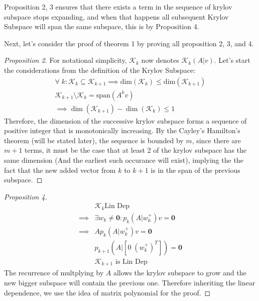 \documentclass[]{article}
\theoremstyle{definition}
\begin{document}
            Proposition 2, 3 ensures that there exists a term in the sequence of krylov subspace stops expanding, and when that happens all subsequent Krylov Subspace will span the same subspace, this is by Proposition 4. 
            \par
            Next, let's consider the proof of theorem 1 by proving all proposition 2, 3, and 4. 
            \begin{proof}[Proposition 2]
                For notational simplicity, $\mathcal K_k$ now denotes $\mathcal K_k(A|v)$. Let's start the considerations from the definition of the Krylov Subspace: 
                \begin{align}
                    \forall\; k: \mathcal K_k \subseteq \mathcal K_{k + 1}\implies \text{dim}(\mathcal K_{k})\le \text{dim}(\mathcal K_{k + 1})
                    \\
                    \mathcal K_{k + 1}\setminus \mathcal K_k = \text{span}(A^{k}v) 
                    \\
                    \implies \dim(\mathcal K_{k + 1}) - \dim(\mathcal K_k) \le 1
                \end{align}
                Therefore, the dimension of the successive krylov subspace forms a sequence of positive integer that is monotonically increasing. By the Cayley's Hamilton's theorem (will be stated later), the sequence is bounded by $m$, since there are $m + 1$ terms, it must be the case that at least 2 of the krylov subspace has the same dimension (And the earliest such occurance will exist), implying the the fact that the new added vector from $k$ to $k + 1$ is in the span of the previous subspace. 
            \end{proof}
            \begin{proof}[Proposition 4]
                \begin{align}
                    & \mathcal K_k \text{Lin Dep}
                    \\
                    \implies & \exists w_k \neq \mathbf 0 : p_k(A|w^+_k)v = \mathbf 0
                    \\
                    \implies & Ap_k(A|w_k^+)v = \mathbf 0
                    \\
                    & p_{k + 1}(A| [0 \; (w_k^+)^T]) = \mathbf 0
                    \\
                    & \mathcal K_{k + 1} \text{ is Lin Dep}
                \end{align}
                The recurrence of multplying by $A$ allows the krylov subspace to grow and the new bigger subspace will contain the previous one. Therefore inheriting the linear dependence, we use the idea of matrix polynomial for the proof. 
            \end{proof}
\end{document}
